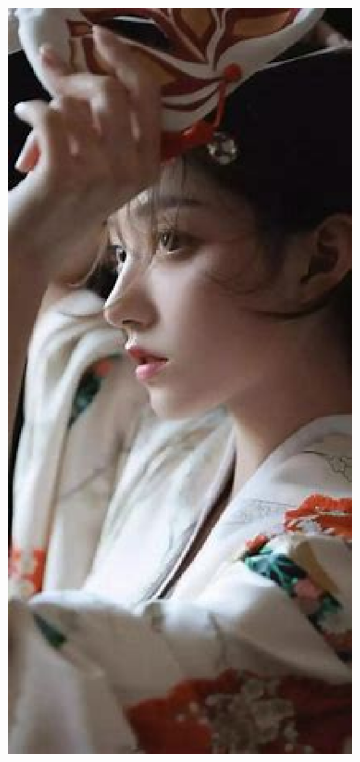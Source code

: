 \begin{figure}[!ht]
\begin{subfigure}[b]{0.32\textwidth}
        \includegraphics[width=\textwidth]{figures/float_exp_meizi}

\end{subfigure}
\end{figure}
